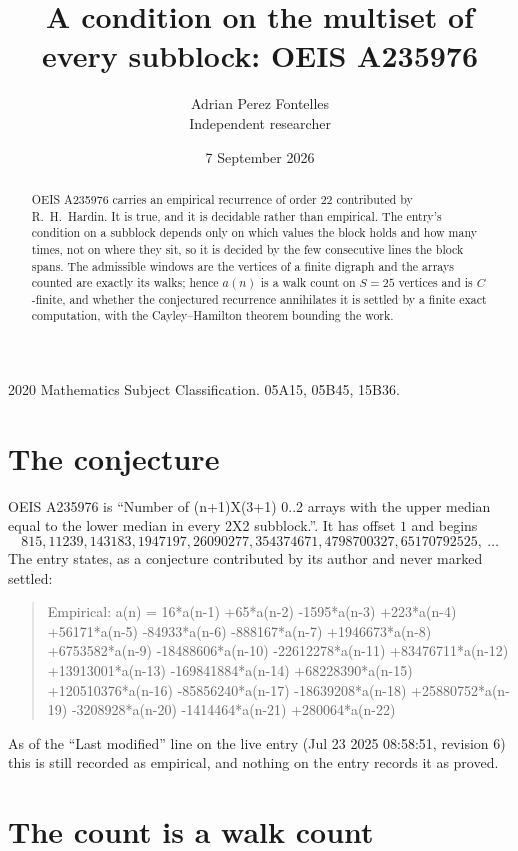 \documentclass[11pt,a4paper]{article}
\title{A condition on the multiset of every subblock: OEIS A235976}
\author{Adrian Perez Fontelles\\ \small Independent researcher}
\date{7 September 2026}
\theoremstyle{plain}
\theoremstyle{definition}
\begin{document}
\maketitle

\begin{abstract}
OEIS A235976 carries an empirical recurrence of order $22$ contributed by R.~H.~Hardin. It is
true, and it is decidable rather than empirical. The entry's condition on a subblock depends
only on which values the block holds and how many times, not on where they sit, so it is
decided by the few consecutive lines the block spans. The admissible windows are the vertices
of a finite digraph and the arrays counted are exactly its walks; hence $a(n)$ is a walk count
on $S=25$ vertices and is $C$-finite, and whether the conjectured recurrence annihilates it
is settled by a finite exact computation, with the Cayley--Hamilton theorem bounding the
work.
\end{abstract}

\noindent\small 2020 Mathematics Subject Classification. 05A15, 05B45, 15B36.\normalsize

\section{The conjecture}

OEIS A235976 is ``Number of (n+1)X(3+1) 0..2 arrays with the upper median equal to the lower median in every 2X2 subblock.''. It has offset $1$ and begins
\[
815, 11239, 143183, 1947197, 26090277, 354374671, 4798700327, 65170792525,\ \dots
\]
The entry states, as a conjecture contributed by its author and never marked settled:
\begin{quote}
Empirical: a(n) = 16*a(n-1) +65*a(n-2) -1595*a(n-3) +223*a(n-4) +56171*a(n-5) -84933*a(n-6) -888167*a(n-7) +1946673*a(n-8) +6753582*a(n-9) -18488606*a(n-10) -22612278*a(n-11) +83476711*a(n-12) +13913001*a(n-13) -169841884*a(n-14) +68228390*a(n-15) +120510376*a(n-16) -85856240*a(n-17) -18639208*a(n-18) +25880752*a(n-19) -3208928*a(n-20) -1414464*a(n-21) +280064*a(n-22)
\end{quote}
As of the ``Last modified'' line on the live entry (Jul 23 2025 08:58:51, revision 6) this is still
recorded as empirical, and nothing on the entry records it as proved.

\section{The count is a walk count}
\end{document}
